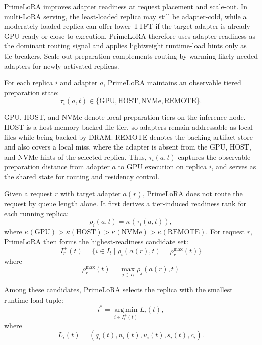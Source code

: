 \documentclass[lettersize,journal]{IEEEtran}
\begin{document}
PrimeLoRA improves adapter readiness at request placement and scale-out. In multi-LoRA serving, the least-loaded replica may still be adapter-cold, while a moderately loaded replica can offer lower TTFT if the target adapter is already GPU-ready or close to execution. PrimeLoRA therefore uses adapter readiness as the dominant routing signal and applies lightweight runtime-load hints only as tie-breakers. Scale-out preparation complements routing by warming likely-needed adapters for newly activated replicas.

For each replica $i$ and adapter $a$, PrimeLoRA maintains an observable tiered preparation state:
\begin{equation}
\tau_i(a,t) \in \{\mathrm{GPU}, \mathrm{HOST}, \mathrm{NVMe}, \mathrm{REMOTE}\}.
\label{eq:adapter_tier}
\end{equation}

GPU, HOST, and NVMe denote local preparation tiers on the inference node. HOST is a host-memory-backed file tier, so adapters remain addressable as local files while being backed by DRAM. REMOTE denotes the backing artifact store and also covers a local miss, where the adapter is absent from the GPU, HOST, and NVMe hints of the selected replica. Thus, $\tau_i(a,t)$ captures the observable preparation distance from adapter $a$ to GPU execution on replica $i$, and serves as the shared state for routing and residency control.

Given a request $r$ with target adapter $a(r)$, PrimeLoRA does not route the request by queue length alone. It first derives a tier-induced readiness rank for each running replica:
\begin{equation}
\rho_i(a,t)=\kappa(\tau_i(a,t)),
\label{eq:readiness_rank}
\end{equation}
where $\kappa(\mathrm{GPU})>\kappa(\mathrm{HOST})>
\kappa(\mathrm{NVMe})>\kappa(\mathrm{REMOTE})$. For request $r$, PrimeLoRA then forms the highest-readiness candidate set:
\begin{equation}
I_r^+(t)=
\{i\in I_t \mid
\rho_i(a(r),t)=\rho_r^{\max}(t)\}
\label{eq:readiness_candidates}
\end{equation}
where
\begin{equation}
\rho_r^{\max}(t)=
\max_{j\in I_t}\rho_j(a(r),t)
\label{eq:max_readiness}
\end{equation}

Among these candidates, PrimeLoRA selects the replica with the smallest runtime-load tuple:
\begin{equation}
i^*=
\operatorname*{arg\,min}_{i\in I_r^+(t)}
L_i(t),
\label{eq:placement_rule}
\end{equation}
where
\begin{equation}
L_i(t)=
(q_i(t),n_i(t),u_i(t),s_i(t),c_i).
\label{eq:load_tuple}
\end{equation}
\end{document}
